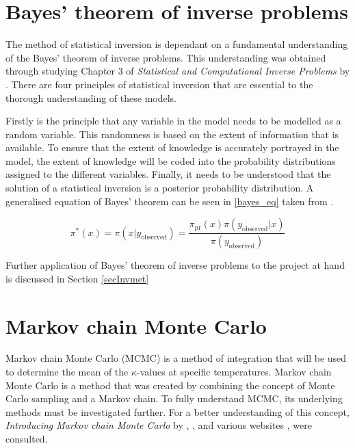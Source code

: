 %
%	

	
\section{Bayes' theorem of inverse problems}

	The method of statistical inversion is dependant on a fundamental understanding of the Bayes' theorem of inverse problems. 
	This understanding was obtained through studying Chapter 3 of \textit{Statistical and Computational Inverse Problems} by \citet{Kaipo:2005}.
	There are four principles of statistical inversion that are essential to the thorough understanding of these models.

	Firstly is the principle that any variable in the model needs to be modelled as a random variable.
	This randomness is based on the extent of information that is available. 
	To ensure that the extent of knowledge is accurately portrayed in the model, the extent of knowledge will be coded into the probability distributions assigned to the different variables. 
	Finally, it needs to be understood that the solution of a statistical inversion is a posterior probability distribution.
	A generalised equation of Bayes' theorem can be seen in \ref{bayes_eq} taken from \citet{Kaipo:2005}.
	
	\begin{equation}
	\label{bayes_eq}
	\pi^* (x) = \pi (x|y_{\text{observed}}) = \frac{\pi_{\text{pr}} (x) \pi (y_{\text{observed}}|x)}{\pi  (y_{\text{observed}})}	
	\end{equation}
	
Further application of Bayes' theorem of inverse problems to the project at hand is discussed in Section \ref{secInvmet}
\section{Markov chain Monte Carlo} \label{MCMCdet}
Markov chain Monte Carlo  (MCMC) is a method of integration that will be used to determine the mean of the $\kappa$-values at specific temperatures. 
	Markov chain Monte Carlo is a method that was created by combining the concept of Monte Carlo sampling  and a Markov chain. 
	To fully understand MCMC, its underlying methods must be investigated further.
	For a better understanding of this concept, \textit{Introducing Markov chain Monte Carlo} by \citet{Gilks:1996}, \citet{Kaipo:2005}, and various websites \citet{MLM:2019}, \citet{dummies:2015} were consulted.

